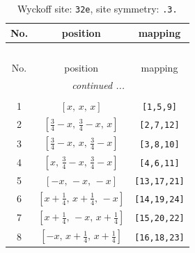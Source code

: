 \documentclass[fleqn,8pt]{jsarticle}
\begin{document}
\renewcommand{\arraystretch}{1.2}
\begin{longtable}{ccc}
\caption{Wyckoff site: {\tt 32e}, site symmetry: {\tt .3.}}
 \\
 \hline \hline
No. & position & mapping \\ \hline \endfirsthead

\multicolumn{2}{l}{\tablename\ \thetable{}} \\
 \hline \hline
No. & position & mapping \\ \hline \endhead

 \hline \hline
\multicolumn{2}{r}{\footnotesize\it continued ...} \\ \endfoot

 \hline \hline
\multicolumn{2}{r}{} \\ \endlastfoot

1 & $\left[ x,\, x,\, x \right]$ & {\tt [1,5,9]} \\ \hline
2 & $\left[ \frac{3}{4} - x,\, \frac{3}{4} - x,\, x \right]$ & {\tt [2,7,12]} \\ \hline
3 & $\left[ \frac{3}{4} - x,\, x,\, \frac{3}{4} - x \right]$ & {\tt [3,8,10]} \\ \hline
4 & $\left[ x,\, \frac{3}{4} - x,\, \frac{3}{4} - x \right]$ & {\tt [4,6,11]} \\ \hline
5 & $\left[ - x,\, - x,\, - x \right]$ & {\tt [13,17,21]} \\ \hline
6 & $\left[ x + \frac{1}{4},\, x + \frac{1}{4},\, - x \right]$ & {\tt [14,19,24]} \\ \hline
7 & $\left[ x + \frac{1}{4},\, - x,\, x + \frac{1}{4} \right]$ & {\tt [15,20,22]} \\ \hline
8 & $\left[ - x,\, x + \frac{1}{4},\, x + \frac{1}{4} \right]$ & {\tt [16,18,23]} \\
\end{longtable}
\renewcommand{\arraystretch}{1.2}
\end{document}
